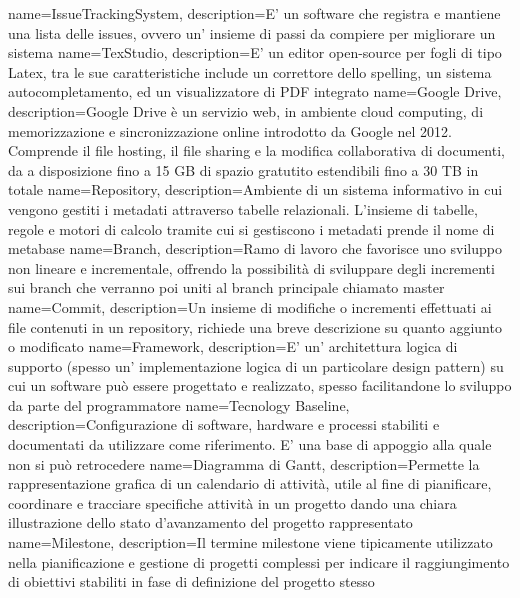 {
    name=IssueTrackingSystem,
    description={E' un software che registra e mantiene una lista delle issues, ovvero un' insieme di passi da compiere per migliorare un sistema}
}
{
    name=TexStudio,
    description={E' un editor open-source per fogli di tipo Latex, tra le sue caratteristiche include un correttore dello spelling, un sistema autocompletamento, ed un visualizzatore di PDF integrato}
}
{
    name=Google Drive,
    description={Google Drive è un servizio web, in ambiente cloud computing, di memorizzazione e sincronizzazione online introdotto da Google nel 2012. Comprende il file hosting, il file sharing e la modifica collaborativa di documenti, da a disposizione fino a 15 GB di spazio gratutito estendibili fino a 30 TB in totale}
}
{
    name=Repository,
    description={Ambiente di un sistema informativo in cui vengono  gestiti i metadati attraverso tabelle relazionali. L’insieme di tabelle, regole e motori di calcolo tramite cui si gestiscono i metadati prende il nome di metabase}
}
{
    name=Branch,
    description={Ramo di lavoro che favorisce uno sviluppo non lineare e incrementale, offrendo la possibilità di sviluppare degli incrementi sui branch che verranno poi uniti al branch principale chiamato master}
}
{
    name=Commit,
    description={Un insieme di modifiche o incrementi effettuati ai file contenuti in un repository, richiede una breve descrizione su quanto aggiunto o modificato}
}
{
    name=Framework,
    description={E' un' architettura logica di supporto (spesso un' implementazione logica di un particolare design pattern) su cui un software può essere progettato e realizzato, spesso facilitandone lo sviluppo da parte del programmatore}
}
{
    name=Tecnology Baseline,
    description={Configurazione di software, hardware e processi stabiliti e documentati da utilizzare come riferimento. E' una base di appoggio alla quale non si può retrocedere}
}
{
    name=Diagramma di Gantt,
    description={Permette la rappresentazione grafica di un calendario di attività, utile al fine di pianificare, coordinare e tracciare specifiche attività in un progetto dando una chiara illustrazione dello stato d'avanzamento del progetto rappresentato}
}
{
    name=Milestone,
    description={Il termine milestone viene tipicamente utilizzato nella pianificazione e gestione di progetti complessi per indicare il raggiungimento di obiettivi stabiliti in fase di definizione del progetto stesso}
}

